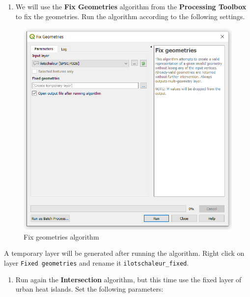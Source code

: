 \documentclass[]{book}
\providecommand{\tightlist}{%
  \setlength{\itemsep}{0pt}\setlength{\parskip}{0pt}}
\theoremstyle{definition}
\theoremstyle{definition}
\theoremstyle{definition}
\theoremstyle{remark}
\begin{document}
\begin{enumerate}
\def\labelenumi{\arabic{enumi}.}
\setcounter{enumi}{3}
\tightlist
\item
  We will use the \textbf{Fix Geometries} algorithm from the
  \textbf{Processing Toolbox} to fix the geometries. Run the algorithm
  according to the following settings.
\end{enumerate}

\begin{figure}

{\centering \includegraphics[width=10.46in]{figures/Fix_Geometry_UHA} 

}

\caption{Fix geometries algorithm}\label{fig:unnamed-chunk-30}
\end{figure}

A temporary layer will be generated after running the algorithm. Right
click on layer \texttt{Fixed\ geometries} and rename it
\texttt{ilotschaleur\_fixed}.

\begin{enumerate}
\def\labelenumi{\arabic{enumi}.}
\setcounter{enumi}{4}
\tightlist
\item
  Run again the \textbf{Intersection} algorithm, but this time use the
  fixed layer of urban heat islands. Set the following parameters:
\end{enumerate}
\end{document}
